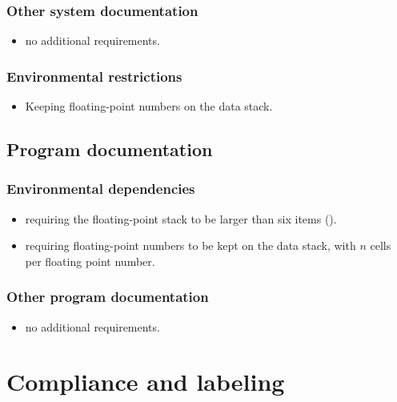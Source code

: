 \subsubsection{Other system documentation} %
\begin{itemize}
\item no additional requirements.
\end{itemize}

\subsubsection{Environmental restrictions} %
\label{float:restrictions}

\begin{itemize}
\item Keeping floating-point numbers on the data stack.
\end{itemize}

\subsection{Program documentation} %

\subsubsection{Environmental dependencies} %
\label{float:dependencies}

\begin{itemize}
\item requiring the floating-point stack to be larger than six items
	().
\item requiring floating-point numbers to be kept on the data stack,
	with $n$ cells per floating point number.
\end{itemize}

\subsubsection{Other program documentation} %
\begin{itemize}
\item no additional requirements.
\end{itemize}

\section{Compliance and labeling} %

